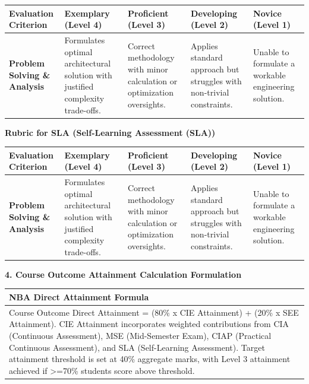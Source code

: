 \documentclass[10pt,a4paper]{article}
\begin{document}
\begin{table}[h!]
\centering
\footnotesize
\begin{tabularx}{\textwidth}{L{2.8cm} Y Y Y Y}
\toprule
{}
\textbf{Evaluation Criterion} & \textbf{Exemplary (Level 4)} & \textbf{Proficient (Level 3)} & \textbf{Developing (Level 2)} & \textbf{Novice (Level 1)} \\
\midrule
\textbf{Problem Solving \& Analysis} & Formulates optimal architectural solution with justified complexity trade-offs. & Correct methodology with minor calculation or optimization oversights. & Applies standard approach but struggles with non-trivial constraints. & Unable to formulate a workable engineering solution. \\
\bottomrule
\end{tabularx}
\end{table}
\vspace{4pt}
{\normalsize\textbf{\color{nbaNavy}Rubric for SLA (Self-Learning Assessment (SLA))}}
\begin{table}[h!]
\centering
\footnotesize
\begin{tabularx}{\textwidth}{L{2.8cm} Y Y Y Y}
\toprule
{}
\textbf{Evaluation Criterion} & \textbf{Exemplary (Level 4)} & \textbf{Proficient (Level 3)} & \textbf{Developing (Level 2)} & \textbf{Novice (Level 1)} \\
\midrule
\textbf{Problem Solving \& Analysis} & Formulates optimal architectural solution with justified complexity trade-offs. & Correct methodology with minor calculation or optimization oversights. & Applies standard approach but struggles with non-trivial constraints. & Unable to formulate a workable engineering solution. \\
\bottomrule
\end{tabularx}
\end{table}

\vspace{6pt}
{\large\textbf{\color{nbaNavy}4. Course Outcome Attainment Calculation Formulation}}

\begin{table}[h!]
\centering
\small
\begin{tabularx}{\textwidth}{Y}
\toprule
{}
\textbf{NBA Direct Attainment Formula} \\
\midrule
Course Outcome Direct Attainment = (80\% x CIE Attainment) + (20\% x SEE Attainment).
CIE Attainment incorporates weighted contributions from CIA (Continuous Assessment), MSE (Mid-Semester Exam), CIAP (Practical Continuous Assessment), and SLA (Self-Learning Assessment). Target attainment threshold is set at 40\% aggregate marks, with Level 3 attainment achieved if >=70\% students score above threshold. \\
\bottomrule
\end{tabularx}
\end{table}
\end{document}
